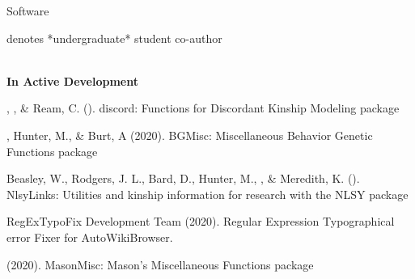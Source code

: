 \begin{rSection}{\textrm{Software}}%
\vspace{-1mm}\begin{center}\footnotesize{denotes *undergraduate* student co-author}\end{center}\vspace{-5mm}\\
{\large \textbf{In Active Development}}
\begin{etaremune}
\item\meb, \jt, \& Ream, C. (\the\year). discord: Functions for Discordant Kinship Modeling \R package 
%
\item\meb, Hunter, M., \& Burt, A (2020). BGMisc: Miscellaneous Behavior Genetic Functions \R package %
%
%
\item  Beasley, W., Rodgers, J. L., Bard, D., Hunter, M., \meb, \& Meredith, K. (\the\year). NlsyLinks: Utilities and kinship information for research with the NLSY \R package \smallskip\\
%

\item RegExTypoFix Development Team (2020). Regular Expression Typographical error Fixer for AutoWikiBrowser. 
%
\item\meb (2020). MasonMisc: Mason's Miscellaneous Functions \R package 
%
%
\end{etaremune}
\end{rSection}